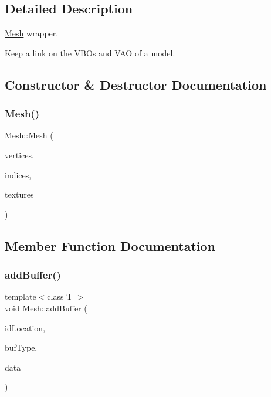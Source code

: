 \subsection{Detailed Description}
\hyperlink{classMesh}{Mesh} wrapper. 

Keep a link on the V\+B\+Os and V\+AO of a model. 

\subsection{Constructor \& Destructor Documentation}
\mbox{\label{classMesh_a54bd1b9e629ff006629579fc8fd6d002}} 
\subsubsection{\texorpdfstring{Mesh()}{Mesh()}}
{\footnotesize\ttfamily Mesh\+::\+Mesh (\begin{DoxyParamCaption}\item[{const std\+::vector$<$ \hyperlink{structVertex}{Vertex} $>$ \&}]{vertices,  }\item[{const std\+::vector$<$ G\+Luint $>$ \&}]{indices,  }\item[{const std\+::vector$<$ \hyperlink{structTexture}{Texture} $>$ \&}]{textures }\end{DoxyParamCaption})}



\subsection{Member Function Documentation}
\mbox{\label{classMesh_a5067620d30ba35b9f83e4dae7fb70cbf}} 
\subsubsection{\texorpdfstring{add\+Buffer()}{addBuffer()}}
{\footnotesize\ttfamily template$<$class T $>$ \\
void Mesh\+::add\+Buffer (\begin{DoxyParamCaption}\item[{G\+Luint \&}]{id\+Location,  }\item[{G\+Lenum}]{buf\+Type,  }\item[{const std\+::vector$<$ T $>$ \&}]{data }\end{DoxyParamCaption})\hspace{0.3cm}{\ttfamily [static]}}



